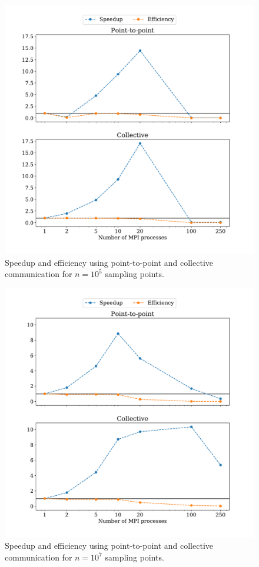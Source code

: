 \documentclass[a4paper, 11pt]{article}
\begin{document}
\begin{figure}
  \centering
  \includegraphics[width=\textwidth]{../trapezoid/plot/100000.pdf}
  \caption{Speedup and efficiency using point-to-point and collective communication for $n=10^{5}$ sampling points.}
  \label{fig:1_n_100k}
\end{figure}
\begin{figure}
  \centering
  \includegraphics[width=\textwidth]{../trapezoid/plot/10000000.pdf}
  \caption{Speedup and efficiency using point-to-point and collective communication for $n=10^{7}$ sampling points.}
  \label{fig:1_n_10M}
\end{figure}
\end{document}
